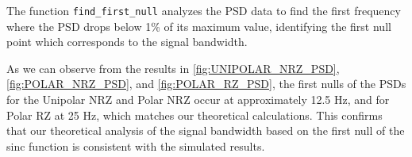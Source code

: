The function \texttt{find\_first\_null} analyzes the PSD data to find the
first frequency where the PSD drops below 1\% of its maximum value,
identifying the first null point which corresponds to the signal bandwidth.

As we can observe from the results in \autoref{fig:UNIPOLAR_NRZ_PSD},
\autoref{fig:POLAR_NRZ_PSD}, and \autoref{fig:POLAR_RZ_PSD}, the first
nulls of the PSDs for the Unipolar NRZ and Polar NRZ occur at approximately
12.5 Hz, and for Polar RZ at 25 Hz, which matches our theoretical
calculations. This confirms that our theoretical analysis of the signal
bandwidth based on the first null of the sinc function is consistent with
the simulated results.